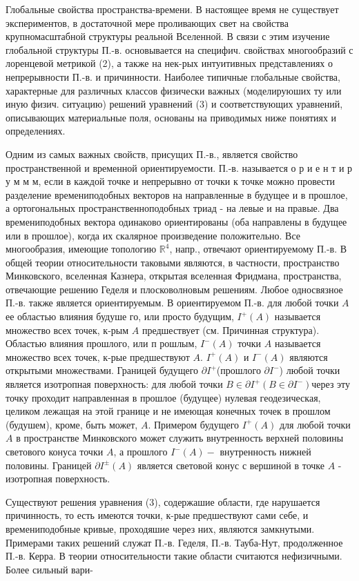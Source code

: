 \documentclass[10pt]{article}
\begin{document}
Глобальные свойства пространства-времени. В настоящее время не существует экспериментов, в достаточной мере проливающих свет на свойства крупномасштабной структуры реальной Вселенной. В связи с этим изучение глобальной структуры П.-в. основывается на специфич. свойствах многообразий с лоренцевой метрикой (2), а также на нек-рых интуитивных представлениях о непрерывности П.-в. и причинности. Наиболее типичные глобальные свойства, характерные для различных классов физически важных (моделируюших ту или иную физич. ситуацию) решений уравнений (3) и соответствующих уравнений, описывающих материальные поля, основаны на приводимых ниже понятиях и определениях.



Одним из самых важных свойств, присущих П.-в., является свойство пространственной и временной ориентируемости. П.-в. называется о р и е н т и р у м м м, если в каждой точке и непрерывно от точки к точке можно провести разделение времениподобных векторов на направленные в будущее и в прошлое, а ортогональных пространственноподобных триад - на левые и на правые. Два времениподобных вектора одинаково ориентированы (оба направлены в будущее или в прошлое), когда их скалярное произведение положительно. Все многообразия, имеющие топологию $\mathbb{R}^{4}$, напр., отвечают ориентируемому П.-в. В общей теории относительности таковыми являются, в частности, пространство Минковского, вселенная Казнера, открытая вселенная Фридмана, пространства, отвечающие решению Геделя и плосковолновым решениям. Любое односвязное П.-в. также является ориентируемым. В ориентируемом П.-в. для любой точки $A$ ее областью влияния будуше го, или просто будущим, $I^{+}(A)$ называется множество всех точек, к-рым $A$ предшествует (см. Причинная структура). Областью влияния прошлого, или п рошлым, $I^{-}(A)$ точки $A$ называется множество всех точек, к-рые предшествуют $A$. $I^{+}(A)$ и $I^{-}(A)$ являются открытыми множествами. Границей будущего $\partial I^{+}$(прошлого $\partial I^{-}$) любой точки является изотропная поверхность: для любой точки $B \in \partial I^{+}\left(B \in \partial I^{-}\right)$через эту точку проходит направленная в прошлое (будущее) нулевая геодезическая, целиком лежащая на этой границе и не имеющая конечных точек в прошлом (будушем), кроме, быть может, $A$. Примером будущего $I^{+}(A)$ для любой точки $A$ в пространстве Минковского может служить внутренность верхней половины светового конуса точки $A$, а прошлого $I^{-}(A)-$ внутренность нижней половины. Границей $\partial I^{ \pm}(A)$ является световой конус с вершиной в точке $A$ - изотропная поверхность.



Существуют решения уравнения (3), содержашие области, где нарушается причинность, то есть имеются точки, к-рые предшествуют сами себе, и времениподобные кривые, проходяшие через них, являются замкнутыми. Примерами таких решений служат П.-в. Геделя, П.-в. Тауба-Нут, продолженное П.-в. Керра. В теории относительности такие области считаются нефизичными. Более сильный вари-
\end{document}
